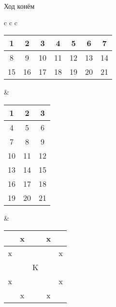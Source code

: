 \begin{problem}{Ход конём}
\begin{center}
\begin{tabular}{c c c}
\begin{minipage}{0.5\thelinewidth}
\begin{tabular}{|c|c|c|c|c|c|c|}
\hline
 1 &  2 &  3 &  4 &  5 &  6 &  7 \\
\hline
 8 &  9 & 10 & 11 & 12 & 13 & 14 \\
\hline
15 & 16 & 17 & 18 & 19 & 20 & 21 \\
\hline
\end{tabular}
\end{minipage}
&
\begin{minipage}{0.18\thelinewidth}
\begin{tabular}{|c|c|c|}
\hline
 1 &  2 &  3 \\
\hline
 4 &  5 &  6 \\
\hline
 7 &  8 &  9 \\
\hline
10 & 11 & 12 \\
\hline
13 & 14 & 15 \\
\hline
16 & 17 & 18 \\
\hline
19 & 20 & 21 \\
\hline
\end{tabular}
\end{minipage}
&
\begin{minipage}{0.3\thelinewidth}
\begin{tabular}{|c|c|c|c|c|}
\hline
~ & x & ~ & x & ~ \\
\hline
x & ~ & ~ & ~ & x \\
\hline
~ & ~ & K & ~ & ~ \\
\hline
x & ~ & ~ & ~ & x \\
\hline
~ & x & ~ & x & ~ \\
\hline
\end{tabular}
\end{minipage}
\\
\end{tabular}
\end{center}

\end{problem}

